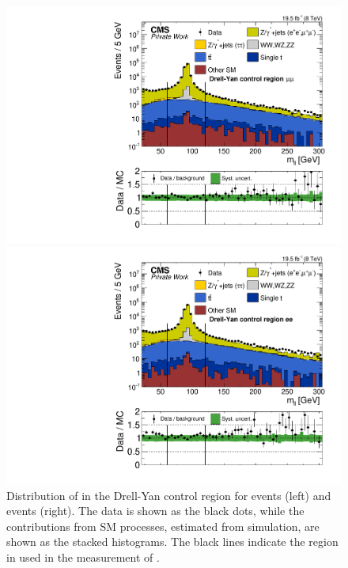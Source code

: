 \begin{figure}[htbp]
\centering
\begin{minipage}[t]{0.49\textwidth}
  \includegraphics[width=\textwidth]{plots/BG/rmue/DrellYanControl_Mll_Full2012_MuMu_TopReweighted.pdf}
\end{minipage}
\begin{minipage}[t]{0.49\textwidth}
\includegraphics[width=\textwidth]{plots/BG/rmue/DrellYanControl_Mll_Full2012_EE_TopReweighted.pdf}
\end{minipage}
\caption{Distribution of \mll in the Drell-Yan control region for \MM events (left) and \EE events (right). The data is shown as the black dots, while the contributions from SM processes, estimated from simulation, are shown as the stacked histograms. The black lines indicate the region in \mll used in the measurement of \rmue.}
\label{fig:rmueMll}
\end{figure} 

